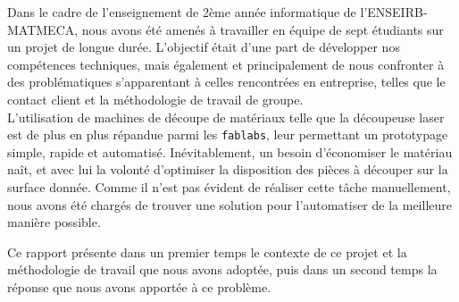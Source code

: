 
Dans le cadre de l'enseignement de 2ème année informatique de l'ENSEIRB-MATMECA, nous avons été amenés à travailler en équipe de sept étudiants sur un projet de longue durée. L'objectif était d'une part de développer nos compétences techniques, mais également et principalement de nous confronter à des problématiques s'apparentant à celles rencontrées en entreprise, telles que le contact client et la méthodologie de travail de groupe.\\

L'utilisation de machines de découpe de matériaux telle que la découpeuse laser est de plus en plus répandue parmi les \texttt{fablabs}, leur permettant un prototypage simple, rapide et automatisé. Inévitablement, un besoin d'économiser le matériau naît, et avec lui la volonté d'optimiser la disposition des pièces à découper sur la surface donnée. Comme il n'est pas évident de réaliser cette tâche manuellement, nous avons été chargés de trouver une solution pour l'automatiser de la meilleure manière possible.

Ce rapport présente dans un premier temps le contexte de ce projet et la méthodologie de travail que nous avons adoptée, puis dans un second temps la réponse que nous avons apportée à ce problème.

